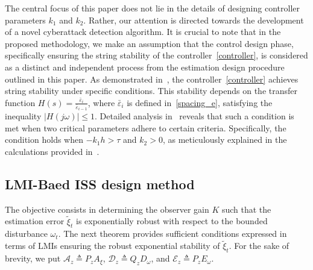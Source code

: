 {\begin{remark}\label{rem_k1_k2}
    The central focus of this paper does not lie in the details of designing controller parameters $k_1$ and $k_2$. 
    Rather, our attention is directed towards the development of a novel cyberattack detection algorithm. It is crucial to note that in the proposed methodology, we make an assumption that the control design phase, specifically ensuring the string stability of the controller~\eqref{controller}, is considered as a distinct and independent process from the estimation design procedure outlined in this paper. As demonstrated in~\cite{rajamani2002semi}, the controller~\eqref{controller} achieves string stability under specific conditions. This stability depends on the transfer function $H(s) = \frac{\bar{\varepsilon}_i}{\bar{\varepsilon}_{i-1}}$, where $\bar{\varepsilon}_i$ is defined in~\eqref{spacing_e}, satisfying the inequality $|H(j \omega)| \leq 1$. Detailed analysis in~\cite{rajamani2002semi} reveals that such a condition is met when two critical parameters adhere to certain criteria. Specifically, the condition holds when $-k_{1} h > \tau$ and $k_2 > 0$, as meticulously explained in the calculations provided in~\cite[Eqs.(32)-(34)]{rajamani2002semi}. %
\end{remark}


\subsection{LMI-Baed ISS design method}\label{sec_LMI}
The objective consists in determining the observer gain $K$ such that the estimation error $\tilde{\xi}_{t}$ is exponentially robust with respect to the bounded disturbance $\omega_t$. The next theorem provides sufficient conditions expressed in terms of LMIs ensuring the robust exponential stability of $\tilde{\xi}_{t}$. For the sake of brevity, we put $\mathcal{A}_z \triangleq P_z A_{\xi}$, $\mathcal{D}_z \triangleq Q_z D_{\omega}$, and $\mathcal{E}_z \triangleq P_z E_{\omega}$.




}
